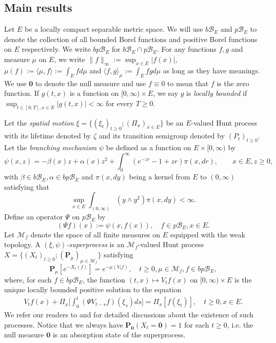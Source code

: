 \documentclass[UTF8]{pkuthss}
\theoremstyle{plain}
\theoremstyle{definition}
\numberwithin{equation}{section}
\begin{document}
\subsection{Main results}	
\label{sec: Main results}
	Let $E$ be a locally compact separable metric space.
	We will use $b\mathscr B_E$ and $p\mathscr B_E$ to denote the collection of all bounded Borel functions and positive Borel functions on $E$ respectively.
	We write $bp\mathscr B_E$ for $b\mathscr B_E \cap p\mathscr B_E$.
	For any functions $f,g$ and measure $\mu$ on $E$, we write $\|f\|_\infty := \sup_{x\in E} |f(x)|$, $\mu(f) :=\langle \mu,f \rangle:= \int_E f d\mu$ and $\langle f,g \rangle_\mu := \int_E fg d\mu$ as long as they have meanings.
	We use $\mathbf 0$ to denote the null measure and use $f\equiv 0$ to mean that $f$ is the zero function.
	If $g(t,x)$ is a function on $[0,\infty)\times E$, we say $g$ is \emph{locally bounded} if $\sup_{t\in [0,T],x\in E} |g(t,x)|<\infty$ for every $T\geq 0$.

	Let the \emph{spatial motion} $\xi=\{(\xi_t)_{t\geq 0};(\Pi_x)_{x\in E}\}$ be an $E$-valued Hunt process with its lifetime denoted by $\zeta$ and its transition semigroup denoted by $(P_t)_{t\geq 0}$.
	Let the \emph{branching mechanism} $\psi$ be defined as a function on $E\times[0,\infty)$ by
\[
 	\psi(x,z) 
 	= -\beta(x)z + \alpha(x)z^2+\int_0^\infty (e^{-zr}-1+zr )\pi(x, dr),
 	\qquad x\in E, z\geq0,
\]
	with $\beta\in b\mathscr B_E,\alpha\in bp\mathscr B_E$ and $\pi(x,dy)$ being a kernel from $E$ to $(0,\infty)$ satisfying that \[\sup_{x\in E} \int_{(0,\infty)} (y\wedge y^2) \pi(x,dy) < \infty.\]
	Define an operator $\Psi$ on $p\mathscr B_E$ by
\[
	(\Psi f) (x)
	:= \psi(x,f(x)),
	\quad f\in p\mathscr B_E, x\in E.
\]
	Let $\mathcal M_f$ denote the space of all finite measures on $E$ equipped with the weak topology.
	A \emph{$(\xi,\psi)$-superprocess} is an $\mathcal M_f$-valued Hunt process $X=\{(X_t)_{t\geq 0}; (\mathbf P_\mu)_{\mu \in \mathcal M_f}\}$ satisfying
\begin{equation}
\label{eq: Defi of Vt}
 	\mathbf P_\mu [e^{-X_t(f)}] = e^{-\mu(V_tf)},
 	\quad t\geq 0, \mu \in \mathcal M_f, f\in bp\mathscr B_E,
\end{equation}
  where, for each $f\in bp\mathscr B_E$, the function $(t,x) \mapsto V_tf(x)$ on $[0,\infty) \times E$ is the unique locally bounded positive solution to the equation
\begin{align}\label{eq: chap 3 FKPP_in_definition}
  	V_t f(x) + \Pi_x \Big[ \int_0^t (\Psi V_{t-s} f)(\xi_s) ds \Big]
	=\Pi_x[f(\xi_t)], \quad t \geq 0, x\in E.
\end{align}
	We refer our readers to \cite{Dawson1993Measurevalued, Dynkin1993Superprocesses}
	and \cite[Section 2.3 \& Theorem 5.11]{Li2011MeasureValued}
	for detailed discussions about the existence of such processes.
	Notice that we always have $\mathbf P_{\mathbf 0}(X_t = \mathbf 0) = 1$ for each $t\geq 0$, i.e. the null measure $\mathbf 0$ is an absorption state of the superprocess.
\end{document}
